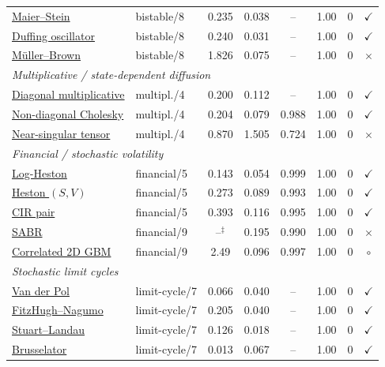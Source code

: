 \begin{table}[t]
\begin{tabular}{l l c c c c c c}
\hyperref[sec:v62-maier-stein]{Maier--Stein} & bistable/8 & 0.235 & 0.038 & -- & 1.00 & 0 & $\checkmark$ \\
\hyperref[sec:v62-duffing]{Duffing oscillator} & bistable/8 & 0.240 & 0.031 & -- & 1.00 & 0 & $\checkmark$ \\
\hyperref[sec:v62-mueller-brown]{M\"uller--Brown} & bistable/8 & 1.826 & 0.075 & -- & 1.00 & 0 & $\times$ \\
\midrule
\multicolumn{8}{l}{\textit{Multiplicative / state-dependent diffusion}}\\
\hyperref[sec:v62-diag-multiplicative]{Diagonal multiplicative} & multipl./4 & 0.200 & 0.112 & -- & 1.00 & 0 & $\checkmark$ \\
\hyperref[sec:v62-nondiag-cholesky]{Non-diagonal Cholesky} & multipl./4 & 0.204 & 0.079 & 0.988 & 1.00 & 0 & $\checkmark$ \\
\hyperref[sec:v62-near-singular]{Near-singular tensor} & multipl./4 & 0.870 & 1.505 & 0.724 & 1.00 & 0 & $\times$ \\
\midrule
\multicolumn{8}{l}{\textit{Financial / stochastic volatility}}\\
\hyperref[sec:v62-heston-logsv]{Log-Heston} & financial/5 & 0.143 & 0.054 & 0.999 & 1.00 & 0 & $\checkmark$ \\
\hyperref[sec:v62-heston-sv]{Heston $(S,V)$} & financial/5 & 0.273 & 0.089 & 0.993 & 1.00 & 0 & $\checkmark$ \\
\hyperref[sec:v62-cir-pair]{CIR pair} & financial/5 & 0.393 & 0.116 & 0.995 & 1.00 & 0 & $\checkmark$ \\
\hyperref[sec:v62-sabr]{SABR} & financial/9 & --$^\ddagger$ & 0.195 & 0.990 & 1.00 & 0 & $\times$ \\
\hyperref[sec:v62-gbm-2d]{Correlated 2D GBM} & financial/9 & 2.49 & 0.096 & 0.997 & 1.00 & 0 & $\circ$ \\
\midrule
\multicolumn{8}{l}{\textit{Stochastic limit cycles}}\\
\hyperref[sec:v62-van-der-pol]{Van der Pol} & limit-cycle/7 & 0.066 & 0.040 & -- & 1.00 & 0 & $\checkmark$ \\
\hyperref[sec:v62-fitzhugh-nagumo]{FitzHugh--Nagumo} & limit-cycle/7 & 0.205 & 0.040 & -- & 1.00 & 0 & $\checkmark$ \\
\hyperref[sec:v62-stuart-landau]{Stuart--Landau} & limit-cycle/7 & 0.126 & 0.018 & -- & 1.00 & 0 & $\checkmark$ \\
\hyperref[sec:v62-brusselator]{Brusselator} & limit-cycle/7 & 0.013 & 0.067 & -- & 1.00 & 0 & $\checkmark$ \\

\end{tabular}
\end{table}
